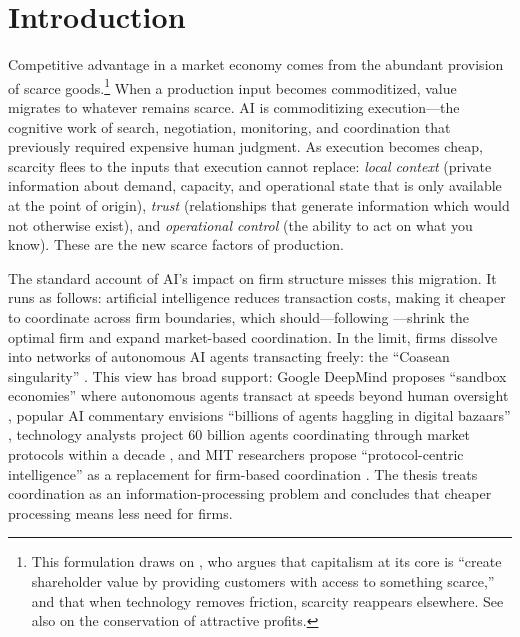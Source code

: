\documentclass[12pt]{article}
\theoremstyle{definition}
\begin{document}
\newpage
\tableofcontents
\newpage

\section{Introduction}

Competitive advantage in a market economy comes from the abundant provision of scarce goods.\footnote{This formulation draws on \citet{danco2017}, who argues that capitalism at its core is ``create shareholder value by providing customers with access to something scarce,'' and that when technology removes friction, scarcity reappears elsewhere. See also \citet{christensen1997} on the conservation of attractive profits.} When a production input becomes commoditized, value migrates to whatever remains scarce. AI is commoditizing execution---the cognitive work of search, negotiation, monitoring, and coordination that previously required expensive human judgment. As execution becomes cheap, scarcity flees to the inputs that execution cannot replace: \textit{local context} (private information about demand, capacity, and operational state that is only available at the point of origin), \textit{trust} (relationships that generate information which would not otherwise exist), and \textit{operational control} (the ability to act on what you know). These are the new scarce factors of production.

The standard account of AI's impact on firm structure misses this migration. It runs as follows: artificial intelligence reduces transaction costs, making it cheaper to coordinate across firm boundaries, which should---following \citet{coase1937}---shrink the optimal firm and expand market-based coordination. In the limit, firms dissolve into networks of autonomous AI agents transacting freely: the ``Coasean singularity'' \citep{shahidi2025}. This view has broad support: Google DeepMind proposes ``sandbox economies'' where autonomous agents transact at speeds beyond human oversight \citep{tomasev2025}, popular AI commentary envisions ``billions of agents haggling in digital bazaars'' \citep{shapiro2024}, technology analysts project 60 billion agents coordinating through market protocols within a decade \citep{azhar2024}, and MIT researchers propose ``protocol-centric intelligence'' as a replacement for firm-based coordination \citep{chopra2024}. The thesis treats coordination as an information-processing problem and concludes that cheaper processing means less need for firms.
\end{document}
